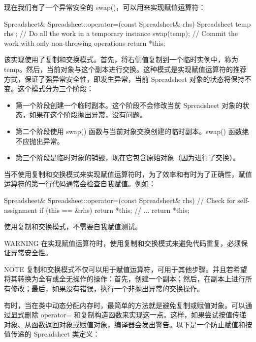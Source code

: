 现在我们有了一个异常安全的 swap()，可以用来实现赋值运算符：

\begin{cpp}
Spreadsheet& Spreadsheet::operator=(const Spreadsheet& rhs)
{
    Spreadsheet temp { rhs }; // Do all the work in a temporary instance
    swap(temp); // Commit the work with only non-throwing operations
    return *this;
}
\end{cpp}

该实现使用了复制和交换模式。首先，将右侧值复制到一个临时实例中，称为 temp。然后，当前对象与这个副本进行交换。这种模式是实现赋值运算符的推荐方式，保证了强异常安全性，即发生异常，当前 Spreadsheet 对象的状态将保持不变。这个模式分为三个阶段：

\begin{itemize}
\item
第一个阶段创建一个临时副本。这个阶段不会修改当前 Spreadsheet 对象的状态，如果在这个阶段抛出异常，没有问题。

\item
第二个阶段使用 swap() 函数与当前对象交换创建的临时副本。swap() 函数绝不应抛出异常。

\item
第三个阶段是临时对象的销毁，现在它包含原始对象（因为进行了交换）。
\end{itemize}

当不使用复制和交换模式来实现赋值运算符时，为了效率和有时为了正确性，赋值运算符的第一行代码通常会检查自我赋值。例如：

\begin{cpp}
Spreadsheet& Spreadsheet::operator=(const Spreadsheet& rhs)
{
    // Check for self-assignment
    if (this == &rhs) { return *this; }
    // ...
    return *this;
}
\end{cpp}

使用复制和交换模式，不需要自我赋值测试。

\begin{myWarning}{WARNING}
在实现赋值运算符时，使用复制和交换模式来避免代码重复，必须保证异常安全性。
\end{myWarning}

\begin{myNotic}{NOTE}
复制和交换模式不仅可以用于赋值运算符，可用于其他步骤。并且若希望将其转换为全有或全无操作的操作：首先，创建一个副本；然后，在副本上进行所有修改；最后，如果没有错误，执行一个非抛出异常的交换操作。
\end{myNotic}


有时，当在类中动态分配内存时，最简单的方法就是避免复制或赋值对象。可以通过显式删除 operator= 和复制构造函数来实现这一点。这样，如果尝试按值传递对象、从函数返回对象或赋值对象，编译器会发出警告。以下是一个防止赋值和按值传递的 Spreadsheet 类定义：


